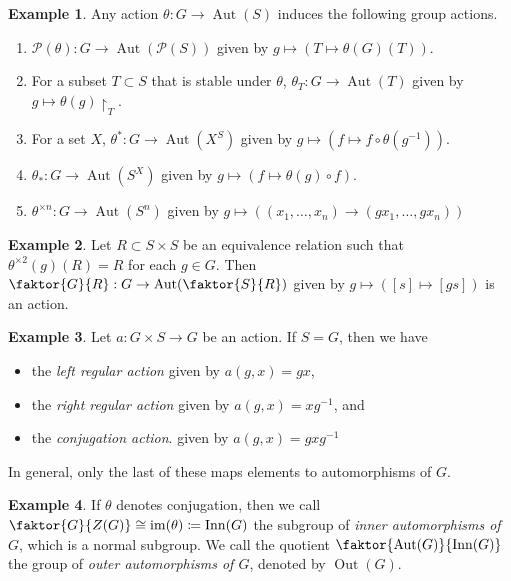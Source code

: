 \documentclass[10pt,letterpaper,cm]{nupset}
\theoremstyle{definition}
\newtheorem{exmp}{Example}
\newcommand{\1}{\mathbf{1}}
\newcommand{\0}{\vec 0}
\DeclareMathOperator{\aut}{Aut}
\DeclareMathOperator{\inn}{Inn}
\DeclareMathOperator{\out}{Out}
\DeclareMathOperator{\im}{im}
\begin{document}
\theoremstyle{exmp}
\begin{exmp}{Any action $\theta : G \to \aut(S)$ induces the following group actions.}


\begin{enumerate}
\item $\mathcal{P}(\theta) : G \to \aut(\mathcal{P}(S))$ given by $g \mapsto (T \mapsto \theta(G)(T))$.
\item For a subset $T \subset S$ that is stable under $\theta$, $\theta_T : G \to \aut(T)$ given by $g \mapsto \theta(g)\restriction_T$.
\item For a set $X$, $\theta^\ast : G \to \aut(X^S)$ given by $g \mapsto (f \mapsto f \circ \theta(g^{-1}))$.
\item $\theta_{\ast}: G \to \aut(S^X)$ given by $g\mapsto (f \mapsto \theta(g) \circ f)$.
\item $\theta^{\times n} : G \to \aut(S^n)$ given by $g \mapsto ((x_1, \ldots, x_n) \to (gx_1, \ldots, gx_n))$

\end{enumerate}

\end{exmp}

\begin{exmp}
Let $R\subset S \times S$ be an equivalence relation such that $\theta^{\times 2}(g)(R) = R$ for each $g 
\in G$. Then $\faktor{G}{R}: G \to \aut(\faktor{S}{R})$ given by $g \mapsto ([s] \mapsto [gs])$ is an action.
\end{exmp}

\begin{exmp}
Let $a : G \times S \to G$ be an action. If $S = G$, then we have 
\begin{itemize}
\item the \textit{left regular action} given by $a(g, x) = gx$, 
\item the \textit{right regular action} given by $a(g, x) = xg^{-1}$, and 
\item the \textit{conjugation action}. given by $a(g, x) = gx g^{-1}$
\end{itemize}
In general, only the last of these maps elements to automorphisms of $G$.
\end{exmp}

\begin{exmp}
If $\theta$ denotes conjugation, then we call $\faktor{G}{Z(G)} \cong \im(\theta)\coloneqq  \inn(G)$ the subgroup of \textit{inner automorphisms of $G$}, which is a normal subgroup. We call the quotient $\faktor{\aut(G)}{\inn(G)}$ the group of \textit{outer automorphisms of $G$}, denoted by $\out(G)$.
\end{exmp}
\end{document}
